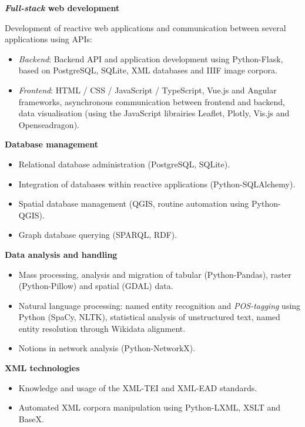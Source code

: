 \datedsubsection{ }
{}
{%
	\textbf{\textit{Full-stack} web development}}
{%
	Development of reactive web applications and communication between several applications using APIs: 
	\begin{itemize}
		\item \textit{Backend}: Backend API and application development using Python-Flask, based on PostgreSQL, SQLite, XML databases and IIIF image corpora.
		\item \textit{Frontend}: HTML / CSS / JavaScript / TypeScript, Vue.js and Angular frameworks, asynchronous communication between frontend and backend, data visualisation (using the JavaScript librairies Leaflet, Plotly, Vis.js and Openseadragon).
	\end{itemize}
}

\datedsubsection{ }
{}
{%
	\textbf{Database management}}
{%
	\begin{itemize}
		\item Relational database administration (PostgreSQL, SQLite).
		\item Integration of databases within reactive applications (Python-SQLAlchemy).
		\item Spatial database management (QGIS, routine automation using Python-QGIS).
		\item Graph database querying (SPARQL, RDF).
	\end{itemize}
}

\datedsubsection{ }
{}
{%
	\textbf{Data analysis and handling}}
{%
	\begin{itemize}
		\item Mass processing, analysis and migration of tabular (Python-Pandas), raster (Python-Pillow) and spatial (GDAL) data.
		\item Natural language processing: named entity recognition and \textit{POS-tagging} using Python (SpaCy, NLTK), statistical analysis of unstructured text, named entity resolution through Wikidata alignment.
		\item Notions in network analysis (Python-NetworkX).
	\end{itemize}
}

\datedsubsection{ }
{}
{%
	\textbf{XML technologies}}
{%
	\begin{itemize}
		\item Knowledge and usage of the XML-TEI and XML-EAD standards.
		\item Automated XML corpora manipulation using Python-LXML, XSLT and BaseX.
	\end{itemize}
}


